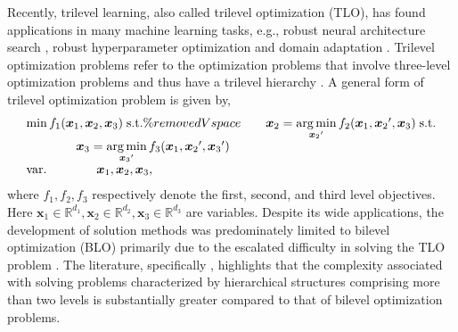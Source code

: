 \documentclass[letterpaper]{article}
\begin{document}
Recently, trilevel learning, also called trilevel optimization (TLO), has found applications in many machine learning tasks, e.g., robust neural architecture search \cite{guo2020meets}, robust hyperparameter optimization \cite{sato2021gradient} and domain adaptation \cite{raghu2021meta}. Trilevel optimization problems refer to the optimization problems that involve three-level optimization problems and thus have a trilevel hierarchy \cite{avraamidou2018mixed,sato2021gradient}. A general form of trilevel optimization problem is given by,
\begin{equation}
\label{eq:trilevel}
\begin{array}{l}
\min  {{f_{1}}({\boldsymbol{x}_1},{\boldsymbol{x}_2},{\boldsymbol{x}_3})} \;{\rm{s}}.{\rm{t}}. \%removedVspace
\qquad {\boldsymbol{x}_2} = \mathop {\arg \min }\limits_{{\boldsymbol{x}_2}'}  {{f_{2}}({\boldsymbol{x}_1},{\boldsymbol{x}_2}',{\boldsymbol{x}_3})} \;{\rm{s}}.{\rm{t}}. \\
\qquad \qquad {\boldsymbol{x}_3} = \mathop {\arg \min }\limits_{{\boldsymbol{x}_3}'}  {{f_{3}}({\boldsymbol{x}_1},{\boldsymbol{x}_2}',{\boldsymbol{x}_3}')} \\
{\mathop{\rm var}}. \qquad \qquad {\boldsymbol{x}_1},{\boldsymbol{x}_2},{\boldsymbol{x}_3},
\end{array}
\end{equation}
where $f_1, f_2, f_3$ respectively denote the first, second, and third level objectives. Here $\boldsymbol{x}_1 \!\in\! \mathbb{R}^{d_1}, \boldsymbol{x}_2 \!\in\! \mathbb{R}^{d_2}, \boldsymbol{x}_3 \!\in\! \mathbb{R}^{d_3}$ are variables. Despite its wide applications, the development of solution methods was predominately limited
to bilevel optimization (BLO) \cite{ji2021bilevel,franceschi2018bilevel} primarily due to the escalated difficulty in solving the TLO problem \cite{sato2021gradient}. The literature, specifically \cite{blair1992computational,avraamidou2018mixed}, highlights that the complexity associated with solving problems characterized by hierarchical structures comprising more than two levels is substantially greater compared to that of bilevel optimization problems.
\end{document}
